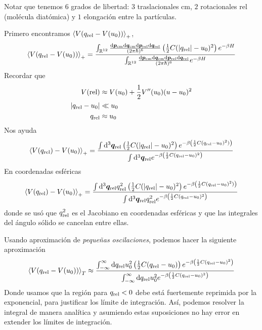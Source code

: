 Notar que tenemos 6 grados de libertad: $3$ traslacionales cm, $2$ rotacionales rel (molécula diatómica) y $1$ elongación entre la partículas.

Primero encontramos $\ev{V(q_{\rm rel}-V(u_0))}_+$,
\begin{align}
  \ev{V(q_{\rm rel}-V(u_0))}_+=\frac{\int_{\mathbb{R}^{12}}\frac{\dd\vec{p}_{\rm cm}\dd\vec{q}_{\rm cm}\dd\vec{p}_{\rm rel}\dd\vec{q}_{\rm rel}}{(2\p \hbar)^6}\left(\frac{1}{2}C(|q_{\rm rel}|-u_0)^2\right)e^{-\b H}}{\int_{\mathbb{R}^{12}}\frac{\dd\vec{p}_{\rm cm}\dd\vec{q}_{\rm cm}\dd\vec{p}_{\rm rel}\dd\vec{q}_{\rm rel}}{(2\p \hbar)^6}e^{-\b H}}
\end{align}
Recordar que
\begin{align}
  V(\text{rel})&\approx V(u_0)+\frac{1}{2}V''(u_0)(u-u_0)^2\\
  |q_{\rm rel}-u_0|&\ll u_0\\
  q_{\rm rel}&\approx u_0
\end{align}
Nos ayuda
\begin{align}
  \ev{V(q_{\rm rel})-V(u_0)}_+=\frac{\int\dd^3\vec{q}_{\rm rel}\left(\frac{1}{2}C(|q_{\rm rel}|-u_0)^2\right)e^{-\b \left(\frac{1}{2}C(q_{\rm rel}-u_0)^2)\right)}}{\int\dd^3\vec{q}_{\rm rel}e^{-\b \left(\frac{1}{2}C(q_{\rm rel}-u_0)^2\right)}}
\end{align}
En coordenadas esféricas
\begin{align}
  \ev{V(q_{\rm rel})-V(u_0)}_+=\frac{\int\dd^3\vec{q}_{\rm rel}q_{\rm rel}^2\left(\frac{1}{2}C(|q_{\rm rel}|-u_0)^2\right)e^{-\b \left(\frac{1}{2}C(q_{\rm rel}-u_0)^2)\right)}}{\int\dd^3\vec{q}_{\rm rel}q_{\rm rel}^2e^{-\b \left(\frac{1}{2}C(q_{\rm rel}-u_0)^2\right)}}
\end{align}
donde se usó que $q_{\rm rel}^2$ es el Jacobiano en coordenadas esféricas y que las integrales del ángulo sólido se cancelan entre ellas.

Usando aproximación de \textit{pequeñas oscilaciones}, podemos hacer la siguiente aproximación
\begin{align}
  \ev{V(q_{\rm rel}-V(u_0))}_T\approx\frac{\int_{-\infty}^\infty \dd q_{\rm rel}u_0^2\left(\frac{1}{2}C(q_{\rm rel}-u_0)\right)e^{-\b \left(\frac{1}{2}C(q_{\rm rel}-u_0)^2\right)}}{\int_{-\infty}^\infty \dd q_{\rm rel}u_0^2e^{-\b\left(\frac{1}{2}C(q_{\rm rel}-u_0)^2\right)}}
\end{align}
Donde usamos que la región para $q_{\rm rel}<0$ debe está fuertemente reprimida por la exponencial, para justificar los límite de integración. Así, podemos resolver la integral de manera analítica y asumiendo estas suposiciones no hay error en extender los límites de integración.

